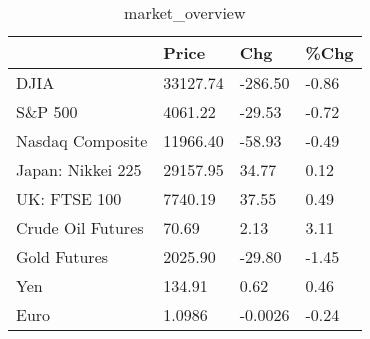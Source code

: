 \documentclass{article}%
\begin{document}
%


\begin{table}[htbp]%
\caption{market\_overview}%
\centering%
\begin{adjustbox}{width=1\textwidth}%
\begin{tabular}{llll}
\toprule
                  &    Price &     Chg &  \%Chg \\
\midrule
             DJIA & 33127.74 & -286.50 & -0.86 \\
          S\&P 500 &  4061.22 &  -29.53 & -0.72 \\
 Nasdaq Composite & 11966.40 &  -58.93 & -0.49 \\
Japan: Nikkei 225 & 29157.95 &   34.77 &  0.12 \\
     UK: FTSE 100 &  7740.19 &   37.55 &  0.49 \\
Crude Oil Futures &    70.69 &    2.13 &  3.11 \\
     Gold Futures &  2025.90 &  -29.80 & -1.45 \\
              Yen &   134.91 &    0.62 &  0.46 \\
             Euro &   1.0986 & -0.0026 & -0.24 \\
\bottomrule
\end{tabular}
%
\end{adjustbox}%
\end{table}

%
\end{document}
